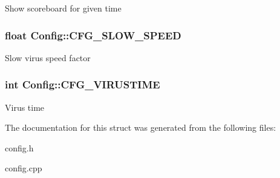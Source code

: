 Show scoreboard for given time \hypertarget{struct_config_a1e059aee7b0dccef0baeae3ac1e51ff8}{
\subsubsection[{C\-F\-G\-\_\-\-S\-L\-O\-W\-\_\-\-S\-P\-E\-E\-D}]{\setlength{\rightskip}{0pt plus 5cm}float Config\-::\-C\-F\-G\-\_\-\-S\-L\-O\-W\-\_\-\-S\-P\-E\-E\-D}}\label{struct_config_a1e059aee7b0dccef0baeae3ac1e51ff8}
Slow virus speed factor \hypertarget{struct_config_a27f5415363ce485450a5e565fc07eedf}{
\subsubsection[{C\-F\-G\-\_\-\-V\-I\-R\-U\-S\-T\-I\-M\-E}]{\setlength{\rightskip}{0pt plus 5cm}int Config\-::\-C\-F\-G\-\_\-\-V\-I\-R\-U\-S\-T\-I\-M\-E}}\label{struct_config_a27f5415363ce485450a5e565fc07eedf}
Virus time 

The documentation for this struct was generated from the following files\-:\begin{DoxyCompactItemize}
\item 
config.\-h\item 
config.\-cpp\end{DoxyCompactItemize}
